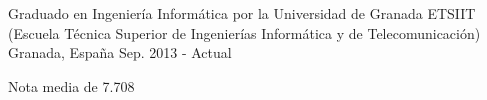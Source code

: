 

\begin{cventries}

  \cventry
    {Graduado en Ingeniería Informática por la Universidad de Granada} %
    {ETSIIT (Escuela Técnica Superior de Ingenierías Informática y de Telecomunicación)} %
    {Granada, España} %
    {Sep. 2013 - Actual} %
    {
      \begin{cvitems} %
        \item {Nota media de 7.708}
      \end{cvitems}
    }

\end{cventries}
